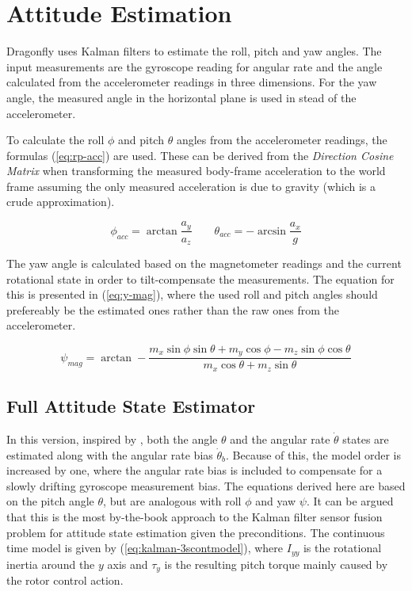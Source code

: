 \documentclass[a4paper]{report}
\begin{document}
	\section{Attitude Estimation}
Dragonfly uses Kalman filters to estimate the roll, pitch and yaw angles. The input measurements are the gyroscope reading for angular rate and the angle calculated from the accelerometer readings in three dimensions. For the yaw angle, the measured angle in the horizontal plane is used in stead of the accelerometer.

To calculate the roll $\phi$ and pitch $\theta$ angles from the accelerometer readings, the formulas (\ref{eq:rp-acc}) are used. These can be derived from the \emph{Direction Cosine Matrix} when transforming the measured body-frame acceleration to the world frame assuming the only measured acceleration is due to gravity (which is a crude approximation).

\begin{equation}
\label{eq:rp-acc}
\phi_{acc} = \arctan \dfrac{a_y}{a_z} \qquad \theta_{acc} = -\arcsin \dfrac{a_x}{g}
\end{equation}

The yaw angle is calculated based on the magnetometer readings and the current rotational state in order to tilt-compensate the measurements. The equation for this is presented in (\ref{eq:y-mag}), where the used roll and pitch angles should prefereably be the estimated ones rather than the raw ones from the accelerometer.

\begin{equation}
\label{eq:y-mag}
\psi_{mag} = \arctan - \dfrac{m_x \sin \phi \sin \theta + m_y \cos \phi - m_z \sin \phi \cos \theta}{m_x \cos \theta + m_z \sin \theta}
\end{equation}

	\subsection{Full Attitude State Estimator}

In this version, inspired by \cite{lhelgesson}, both the angle $\theta$ and the angular rate $\dot{\theta}$ states are estimated along with the angular rate bias $\dot{\theta}_b$. Because of this, the model order is increased by one, where the angular rate bias is included to compensate for a slowly drifting gyroscope measurement bias. The equations derived here are based on the pitch angle $\theta$, but are analogous with roll $\phi$ and yaw $\psi$. It can be argued that this is the most by-the-book approach to the Kalman filter sensor fusion problem for attitude state estimation given the preconditions. The continuous time model is given by (\ref{eq:kalman-3scontmodel}), where $I_{yy}$ is the rotational inertia around the $y$ axis and $\tau_y$ is the resulting pitch torque mainly caused by the rotor control action.
\end{document}
